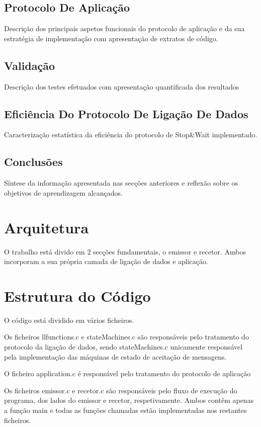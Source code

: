 \documentclass{article}
\begin{document}
\subsection{Protocolo De Aplicação}
Descrição dos principais aspetos funcionais do protocolo de aplicação e da sua estratégia de implementação com apresentação de extratos de código.

\subsection{Validação}
Descrição dos testes efetuados com apresentação quantificada dos resultados

\subsection{Eficiência Do Protocolo De Ligação De Dados}
Caracterização estatística da eficiência do protocolo de Stop\&Wait implementado.

\subsection{Conclusões}
Síntese da informação apresentada nas secções anteriores e reflexão sobre os objetivos de aprendizagem alcançados.


\section{Arquitetura}
O trabalho está divido em 2 secções fundamentais, o emissor e recetor. Ambos incorporam a sua própria camada de ligação de dados e aplicação.

\section{Estrutura do Código}
O código está dividido em vários ficheiros.

Os ficheiros llfunctions.c e stateMachines.c são responsáveis pelo tratamento do protocolo da ligação de dados, sendo stateMachines.c unicamente responsável pela implementação das máquinas de estado de aceitação de mensagens.

O ficheiro application.c é responsável pelo tratamento do protocolo de aplicação

Os ficheiros emissor.c e recetor.c são responsáveis pelo fluxo de execução do programa, dos lados do emissor e recetor, respetivamente. Ambos contêm apenas a função main e todas as funções chamadas estão implementadas nos restantes ficheiros.
\end{document}
